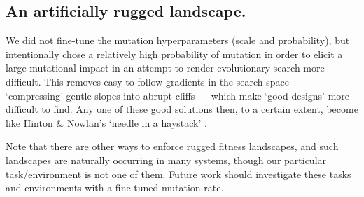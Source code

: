 

\subsection*{An artificially rugged landscape.}

We did not fine-tune the mutation hyperparameters (scale and probability), but intentionally chose a relatively high probability of mutation in order to elicit a large mutational impact in an attempt to render evolutionary search more difficult. 
This removes easy to follow gradients in the search space --- `compressing' gentle slopes into abrupt cliffs --- which make `good designs' more difficult to find.  Any one of these good solutions then, to a certain extent, become like Hinton \& Nowlan's `needle in a haystack' \cite{hinton1987learning}.

Note that there are other ways to enforce rugged fitness landscapes, and such landscapes are naturally occurring in many systems, though our particular task/environment is not one of them. Future work should investigate these tasks and environments with a fine-tuned mutation rate. 

